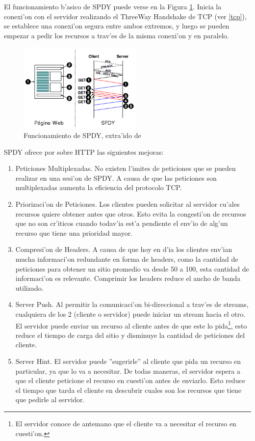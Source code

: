 El funcionamiento b'asico de SPDY puede verse en la Figura \ref{spdy}. Inicia la conexi'on con el servidor realizando el ThreeWay Handshake de TCP (ver \ref{tcp}), se establece una conexi'on segura entre ambos extremos, y luego se pueden empezar a pedir los recursos a trav'es de la misma conexi'on y en paralelo.
\begin{figure}[ht!]
  	\centering
	\includegraphics[width=230px]{img/spdy}
	\caption{\small Funcionamiento de SPDY, extra'ido de \citep{towards}}
	\label{spdy}
\end{figure}

SPDY ofrece por sobre HTTP las siguientes mejoras:
\begin{enumerate}
\item Peticiones Multiplexadas. No existen l'imites de peticiones que se pueden realizar en una sesi'on de SPDY. A causa de que las peticiones son multiplexadas aumenta la eficiencia del protocolo TCP.
\item Priorizaci'on de Peticiones. Los clientes pueden solicitar al servidor cu'ales recursos quiere obtener antes que otros. Esto evita la congesti'on de recursos que no son cr'iticos cuando todav'ia est'a pendiente el env'io de alg'un recurso que tiene una prioridad mayor.
\item Compresi'on de Headers. A causa de que hoy en d'ia los clientes env'ian mucha informaci'on redundante en forma de headers, como la cantidad de peticiones para obtener un sitio promedio va desde 50 a 100, esta cantidad de informaci'on es relevante. Comprimir los headers reduce el ancho de banda utilizado.
\item Server Push. Al permitir la comunicaci'on bi-direccional a trav'es de streams, cualquiera de los 2 (cliente o servidor) puede iniciar un stream hacia el otro. El servidor puede enviar un recurso al cliente antes de que este lo pida\footnote{El servidor conoce de antemano que el cliente va a necesitar el recurso en cuesti'on.}, esto reduce el tiempo de carga del sitio y disminuye la cantidad de peticiones del cliente.
\item Server Hint. El servidor puede ''sugerirle'' al cliente que pida un recurso en particular, ya que lo va a necesitar. De todas maneras, el servidor espera a que el cliente peticione el recurso en cuesti'on antes de enviarlo. Esto reduce el tiempo que tarda el cliente en descubrir cuales son los recursos que tiene que pedirle al servidor.
\end{enumerate}

